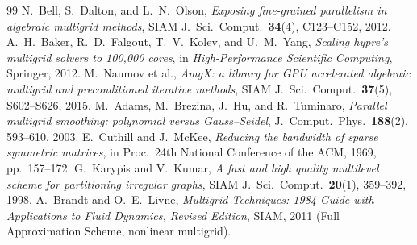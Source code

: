 \documentclass[review]{siamart220329}
\begin{document}
\begin{thebibliography}{99}
 N.~Bell, S.~Dalton, and L.~N.~Olson, \emph{Exposing fine-grained
parallelism in algebraic multigrid methods}, SIAM J.\ Sci.\ Comput.\ \textbf{34}(4), C123--C152, 2012.
 A.~H.~Baker, R.~D.~Falgout, T.~V.~Kolev, and U.~M.~Yang, \emph{Scaling
hypre's multigrid solvers to 100{,}000 cores}, in \emph{High-Performance Scientific Computing},
Springer, 2012.
 M.~Naumov et al., \emph{AmgX: a library for GPU accelerated algebraic multigrid and
preconditioned iterative methods}, SIAM J.\ Sci.\ Comput.\ \textbf{37}(5), S602--S626, 2015.
 M.~Adams, M.~Brezina, J.~Hu, and R.~Tuminaro, \emph{Parallel multigrid
smoothing: polynomial versus Gauss--Seidel}, J.\ Comput.\ Phys.\ \textbf{188}(2), 593--610, 2003.
 E.~Cuthill and J.~McKee, \emph{Reducing the bandwidth of sparse symmetric
matrices}, in Proc.\ 24th National Conference of the ACM, 1969, pp.~157--172.
 G.~Karypis and V.~Kumar, \emph{A fast and high quality multilevel scheme for
partitioning irregular graphs}, SIAM J.\ Sci.\ Comput.\ \textbf{20}(1), 359--392, 1998.
 A.~Brandt and O.~E.~Livne, \emph{Multigrid Techniques: 1984 Guide with
Applications to Fluid Dynamics, Revised Edition}, SIAM, 2011 (Full Approximation Scheme,
nonlinear multigrid).
\end{thebibliography}
\end{document}
